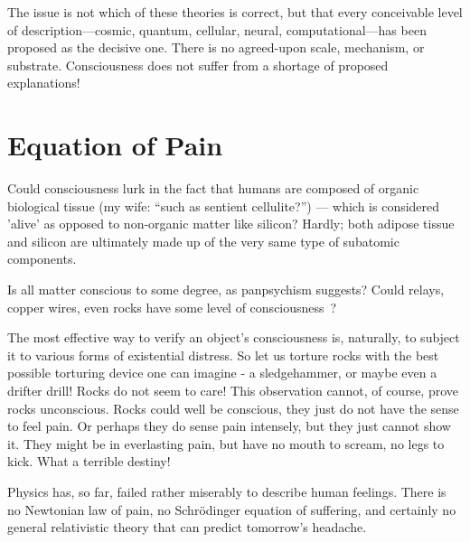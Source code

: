The issue is not which of these theories is correct, but that every conceivable level of description—cosmic, quantum, cellular, neural, computational—has been proposed as the decisive one. There is no agreed-upon scale, mechanism, or substrate. Consciousness does not suffer from a shortage of proposed explanations!


\section{Equation of Pain}

Could consciousness lurk in the fact that humans are composed of organic biological tissue (my wife: ``such as sentient cellulite?'') — which is considered 'alive' as opposed to non-organic matter like silicon? Hardly; both adipose tissue and silicon are ultimately made up of the very same type of subatomic components.

Is all matter conscious to some degree, as panpsychism suggests? Could relays, copper wires, even rocks have some level of 
consciousness~\cite{Goff2019,Strawson2006,Chalmers2015,Whitehead1929}?

The most effective way to verify an object's consciousness is, naturally, to subject it to various forms of existential distress.
So let us torture rocks with the best possible torturing device one can imagine - a sledgehammer, or maybe even a drifter drill!
Rocks do not seem to care! This observation cannot, of course, prove rocks unconscious. Rocks could well be conscious, 
they just do not have the sense to feel pain. Or perhaps they do sense pain intensely, but they just cannot show it. 
They might be in everlasting pain, but have no mouth to scream, no legs to kick. What a terrible destiny!

Physics has, so far, failed rather miserably to describe human feelings. There is no Newtonian law of pain, no Schrödinger equation of suffering,
and certainly no general relativistic theory that can predict tomorrow’s headache.

